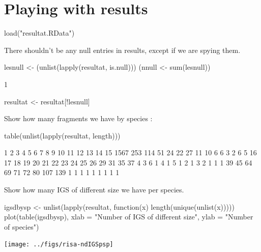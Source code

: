 \documentclass{article}
\begin{document}
\section{Playing with results}

\begin{Schunk}
\begin{Sinput}
 load("resultat.RData")
\end{Sinput}
\end{Schunk}

There shouldn't be any null entries in results, except if we are
spying them.

\begin{Schunk}
\begin{Sinput}
 lesnull <- (unlist(lapply(resultat, is.null)))
 (nnull <- sum(lesnull))
\end{Sinput}
\begin{Soutput}
[1] 1
\end{Soutput}
\begin{Sinput}
 resultat <- resultat[!lesnull]
\end{Sinput}
\end{Schunk}

Show how many fragments we have by species :

\begin{Schunk}
\begin{Sinput}
 table(unlist(lapply(resultat, length)))
\end{Sinput}
\begin{Soutput}
   1    2    3    4    5    6    7    8    9   10   11   12   13   14   15 
1567  253  114   51   24   22   27   11   10    6    6    3    2    6    5 
  16   17   18   19   20   21   22   23   24   25   26   29   31   35   37 
   4    3    6    1    4    1    5    1    2    1    3    2    1    1    1 
  39   45   64   69   71   72   80  107  139 
   1    1    1    1    1    1    1    1    1 
\end{Soutput}
\end{Schunk}

Show how many IGS of different size we have per species.

\begin{Schunk}
\begin{Sinput}
 igsdbysp <- unlist(lapply(resultat, function(x) length(unique(unlist(x)))))
 plot(table(igsdbysp), xlab = "Number of IGS of different size", 
     ylab = "Number of species")
\end{Sinput}
\end{Schunk}
\texttt{[image: ../figs/risa-ndIGSpsp]}
\end{document}
